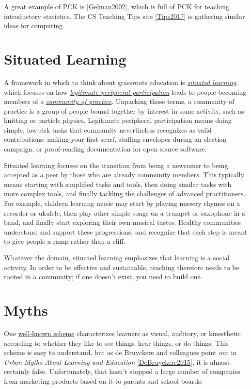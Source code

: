 \documentclass[10pt,statementpaper]{memoir}
\begin{document}
A great example of PCK is
{[}\href{biblio.html\#gelman-stats}{Gelman2002}{]}, which is full of PCK
for teaching introductory statistics. The CS Teaching Tips site
{[}\href{biblio.html\#cs-teaching-tips}{Tips2017}{]} is gathering
similar ideas for computing.

\section{Situated Learning}\label{situated-learning}

A framework in which to think about grassroots education is
\emph{\href{gloss.html\#situated-learning}{situated learning}}, which
focuses on how
\emph{\href{gloss.html\#legitimate-peripheral-participation}{legitimate
peripheral participation}} leads to people becoming members of a
\emph{\href{gloss.html\#community-of-practice}{community of practice}}.
Unpacking those terms, a community of practice is a group of people
bound together by interest in some activity, such as knitting or
particle physics. Legitimate peripheral participation means doing
simple, low-risk tasks that community nevertheless recognizes as valid
contributions: making your first scarf, stuffing envelopes during an
election campaign, or proof-reading documentation for open source
software.

Situated learning focuses on the transition from being a newcomer to
being accepted as a peer by those who are already community members.
This typically means starting with simplified tasks and tools, then
doing similar tasks with more complex tools, and finally tackling the
challenges of advanced practitioners. For example, children learning
music may start by playing nursery rhymes on a recorder or ukulele, then
play other simple songs on a trumpet or saxophone in a band, and finally
start exploring their own musical tastes. Healthy communities understand
and support these progressions, and recognize that each step is meant to
give people a ramp rather than a cliff.

Whatever the domain, situated learning emphasizes that learning is a
social activity. In order to be effective and sustainable, teaching
therefore needs to be rooted in a community; if one doesn't exist, you
need to build one.

\section{Myths}\label{myths}

One
\href{https://en.wikipedia.org/wiki/Learning_styles\#Learning_modalities}{well-known
scheme} characterizes learners as visual, auditory, or kinesthetic
according to whether they like to see things, hear things, or do things.
This scheme is easy to understand, but as de Bruyckere and colleagues
point out in \emph{Urban Myths About Learning and Education}
{[}\href{biblio.html\#debruyckere-urban-myths}{DeBruyckere2015}{]}, it
is almost certainly false. Unfortunately, that hasn't stopped a large
number of companies from marketing products based on it to parents and
school boards.
\end{document}
